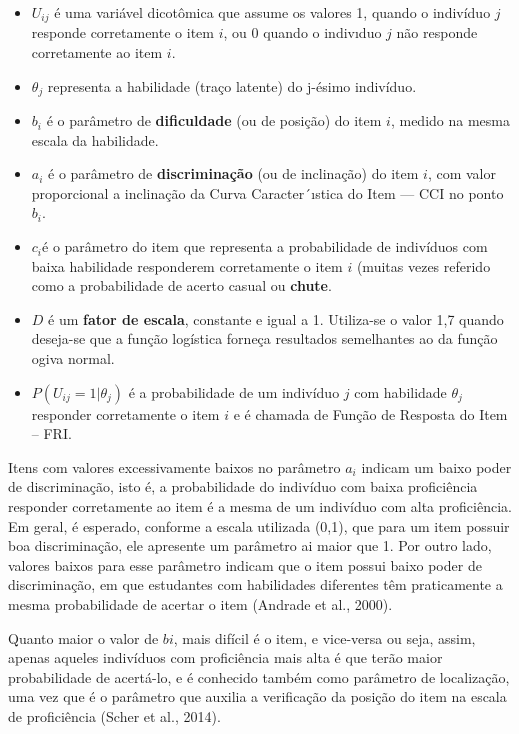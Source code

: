 \documentclass[12pt]{article}
\begin{document}
\begin{itemize}
\item $U_{ij}$ é uma variável dicotômica que assume os valores 1, quando o indivíduo $j$ responde corretamente o item $i$, ou 0 quando o indivıduo $j$ não responde
corretamente ao item $i$.
\item $\theta_{j}$ representa a habilidade (traço latente) do j-ésimo indivíduo.
\item $b_{i}$ é o parâmetro de \textbf{dificuldade} (ou de posição) do item $i$, medido na mesma
escala da habilidade.
\item $a_{i}$ é o parâmetro de \textbf{discriminação} (ou de inclinação) do item $i$, com valor
proporcional a inclinação da Curva Caracter´ıstica do Item — CCI no
ponto $b_{i}$.
\item $c_{i} $é o parâmetro do item que representa a probabilidade de indivíduos
com baixa habilidade responderem corretamente o item $i$ (muitas vezes
referido como a probabilidade de acerto casual ou \textbf{chute}.
\item $D$ é um \textbf{fator de escala}, constante e igual a 1. Utiliza-se o valor 1,7 quando deseja-se que a função logística forneça resultados semelhantes ao da
função ogiva normal.
\item $P(U_{ij}=1|\theta_{j})$ é a probabilidade de um indivíduo $j$ com habilidade $\theta_{j}$ responder corretamente o item $i$ e é chamada de Função de Resposta do Item – FRI.
\end{itemize}


Itens com valores excessivamente baixos no parâmetro $a_{i}$ indicam um baixo poder de discriminação, isto é, a probabilidade do indivíduo com baixa proficiência responder corretamente ao item é a mesma de um indivíduo com alta proficiência. Em geral, é esperado, conforme a escala utilizada (0,1), que para um item possuir boa discriminação, ele apresente um parâmetro ai maior que 1. Por outro lado, valores baixos para esse parâmetro indicam que o item possui baixo poder de discriminação, em que estudantes com habilidades diferentes têm praticamente a mesma probabilidade de acertar o item (Andrade et al., 2000).


Quanto maior o valor de $b{i}$, mais difícil é o item, e vice-versa ou seja, assim, apenas aqueles indivíduos com proficiência mais alta é que terão maior probabilidade de acertá-lo, e é conhecido também como parâmetro de localização, uma vez que é o parâmetro que auxilia a verificação da posição do item na escala de proficiência (Scher et al., 2014).
\end{document}
